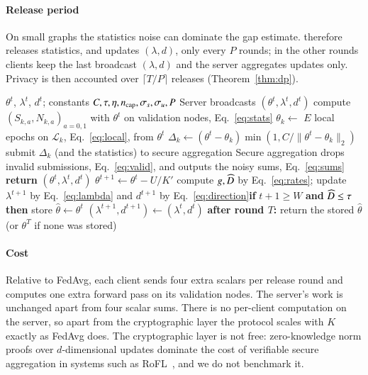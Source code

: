 \paragraph{Release period}
On small graphs the statistics noise can dominate the gap estimate. \clamp{} therefore releases statistics, and updates $(\lambda,d)$, only every $P$ rounds; in the other rounds clients keep the last broadcast $(\lambda,d)$ and the server aggregates updates only. Privacy is then accounted over $\lceil T/P\rceil$ releases (Theorem~\ref{thm:dp}).

\begin{algorithm}[t]
\caption{One round $t$ of \clamp{}}\label{alg:clamp}
\begin{algorithmic}[1]
\REQUIRE $\theta^t$, $\lambda^t$, $d^t$; constants $C,\tau,\eta,n_{\mathrm{cap}},\sigma_s,\sigma_u,P$
\STATE Server broadcasts $(\theta^t,\lambda^t,d^t)$
   \STATE compute $(S_{k,a},N_{k,a})_{a=0,1}$ with $\theta^t$ on validation nodes, Eq.~\eqref{eq:stats} \ENDIF
  \STATE $\theta_k\leftarrow$ $E$ local epochs on $\mathcal{L}_k$, Eq.~\eqref{eq:local}, from $\theta^t$
  \STATE $\Delta_k\leftarrow(\theta^t-\theta_k)\min(1,C/\|\theta^t-\theta_k\|_2)$
  \STATE submit $\Delta_k$ (and the statistics) to secure aggregation
\ENDFOR
\STATE Secure aggregation drops invalid submissions, Eq.~\eqref{eq:valid}, and outputs the noisy sums, Eq.~\eqref{eq:sums}
 \STATE \textbf{return} $(\theta^t,\lambda^t,d^t)$ \ENDIF
\STATE $\theta^{t+1}\leftarrow\theta^t-U/K'$
  \STATE compute $g,\widehat{D}$ by Eq.~\eqref{eq:rates}; update $\lambda^{t+1}$ by Eq.~\eqref{eq:lambda} and $d^{t+1}$ by Eq.~\eqref{eq:direction}\STATE \textbf{if} $t+1\ge W$ \textbf{and} $\widehat{D}\le\tau$ \textbf{then} store $\hat\theta\leftarrow\theta^t$ 
\ELSE \STATE $(\lambda^{t+1},d^{t+1})\leftarrow(\lambda^t,d^t)$ \ENDIF
\STATE \textbf{after round $T$:} return the stored $\hat\theta$ (or $\theta^{T}$ if none was stored)
\end{algorithmic}
\end{algorithm}

\paragraph{Cost}
Relative to FedAvg, each client sends four extra scalars per release round and computes one extra forward pass on its validation nodes. The server's work is unchanged apart from four scalar sums. There is no per-client computation on the server, so apart from the cryptographic layer the protocol scales with $K$ exactly as FedAvg does. The cryptographic layer is not free: zero-knowledge norm proofs over $d$-dimensional updates dominate the cost of verifiable secure aggregation in systems such as RoFL~\citep{lycklama2023rofl}, and we do not benchmark it.

